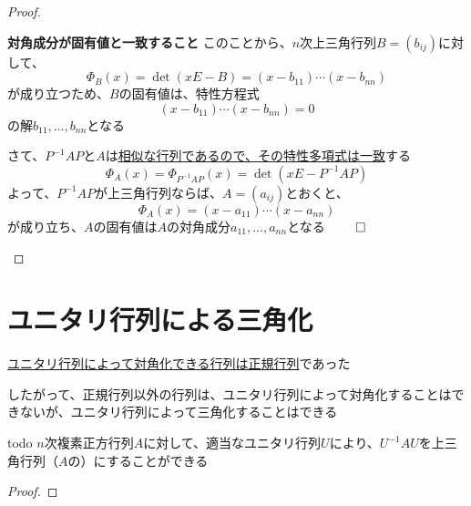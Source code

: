 \documentclass[../../../topic_linear-algebra]{subfiles}
\begin{document}
\begin{proof}
\begin{subpattern}{\bfseries 対角成分が固有値と一致すること}
    このことから、$n$次上三角行列$B = (b_{ij})$に対して、
    \begin{equation*}
      \Phi_B(x) = \det(xE - B) = (x-b_{11})\cdots (x-b_{nn})
    \end{equation*}
    が成り立つため、$B$の固有値は、特性方程式
    \begin{equation*}
      (x-b_{11})\cdots (x-b_{nn}) = 0
    \end{equation*}
    の解$b_{11},\ldots,b_{nn}$となる

    \br

    さて、$P^{-1}AP$と$A$は\hyperref[thm:char-poly-of-similar-matrices]{相似な行列であるので、その特性多項式は一致}する
    \begin{equation*}
      \Phi_A(x) = \Phi_{P^{-1}AP}(x) = \det(xE - P^{-1}AP)
    \end{equation*}
    よって、$P^{-1}AP$が上三角行列ならば、$A = (a_{ij})$とおくと、
    \begin{equation*}
      \Phi_A(x) = (x - a_{11})\cdots (x - a_{nn})
    \end{equation*}
    が成り立ち、$A$の固有値は$A$の対角成分$a_{11},\ldots,a_{nn}$となる $\qed$
  \end{subpattern}
\end{proof}

\sectionline
\section{ユニタリ行列による三角化}

\hyperref[thm:unitary-diagonalization-of-normal]{ユニタリ行列によって対角化できる行列は正規行列}であった

したがって、正規行列以外の行列は、ユニタリ行列によって対角化することはできないが、ユニタリ行列によって三角化することはできる

\begin{theorem}{todo}
  $n$次複素正方行列$A$に対して、適当なユニタリ行列$U$により、$U^{-1}AU$を上三角行列（$A$の）にすることができる
\end{theorem}

\begin{proof}
  \todo{}
\end{proof}
\end{document}

